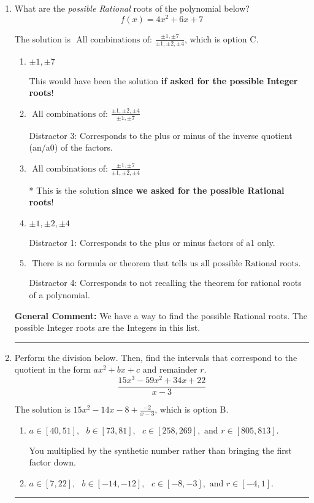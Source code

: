 \documentclass{extbook}[14pt]
\newcommand{\litem}[1]{\item #1

\rule{\textwidth}{0.4pt}}
\begin{document}
\begin{enumerate}\litem{
What are the \textit{possible Rational} roots of the polynomial below?
\[ f(x) = 4x^{2} +6 x + 7 \]

The solution is \( \text{ All combinations of: }\frac{\pm 1,\pm 7}{\pm 1,\pm 2,\pm 4} \), which is option C.\begin{enumerate}[label=\Alph*.]
\item \( \pm 1,\pm 7 \)

This would have been the solution \textbf{if asked for the possible Integer roots}!
\item \( \text{ All combinations of: }\frac{\pm 1,\pm 2,\pm 4}{\pm 1,\pm 7} \)

 Distractor 3: Corresponds to the plus or minus of the inverse quotient (an/a0) of the factors. 
\item \( \text{ All combinations of: }\frac{\pm 1,\pm 7}{\pm 1,\pm 2,\pm 4} \)

* This is the solution \textbf{since we asked for the possible Rational roots}!
\item \( \pm 1,\pm 2,\pm 4 \)

 Distractor 1: Corresponds to the plus or minus factors of a1 only.
\item \( \text{ There is no formula or theorem that tells us all possible Rational roots.} \)

 Distractor 4: Corresponds to not recalling the theorem for rational roots of a polynomial.
\end{enumerate}

\textbf{General Comment:} We have a way to find the possible Rational roots. The possible Integer roots are the Integers in this list.
}
\litem{
Perform the division below. Then, find the intervals that correspond to the quotient in the form $ax^2+bx+c$ and remainder $r$.
\[ \frac{15x^{3} -59 x^{2} +34 x + 22}{x -3} \]

The solution is \( 15x^{2} -14 x -8 + \frac{-2}{x -3} \), which is option B.\begin{enumerate}[label=\Alph*.]
\item \( a \in [40, 51], \text{   } b \in [73, 81], \text{   } c \in [258, 269], \text{   and   } r \in [805, 813]. \)

 You multiplied by the synthetic number rather than bringing the first factor down.
\item \( a \in [7, 22], \text{   } b \in [-14, -12], \text{   } c \in [-8, -3], \text{   and   } r \in [-4, 1]. \)


\end{enumerate}}
\end{enumerate}
\end{document}
